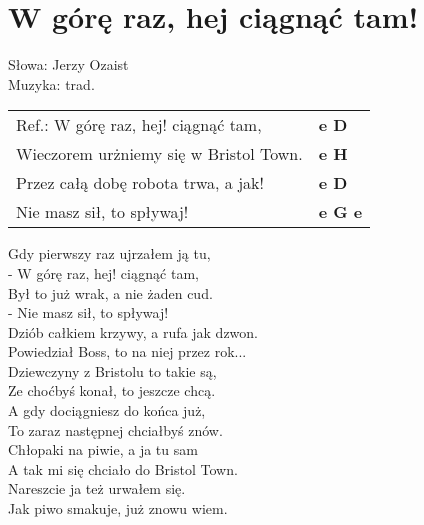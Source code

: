 \section{W górę raz, hej ciągnąć tam!}

Słowa: Jerzy Ozaist \\
Muzyka:  trad.

\vspace{2em}
\begin{tabular}{@{}p{9cm}@{}l@{}}
Ref.: W górę raz, hej! ciągnąć tam, & \bfseries  e D \\
Wieczorem urżniemy się w Bristol Town. & \bfseries  e H \\
Przez całą dobę robota trwa, a jak! & \bfseries  e D \\
Nie masz sił, to spływaj! & \bfseries e G e \\
\end{tabular}

\vspace{1em}
Gdy pierwszy raz ujrzałem ją tu, \\
- W górę raz, hej! ciągnąć tam, \\
Był to już wrak, a nie żaden cud. \\
- Nie masz sił, to spływaj! \\

Dziób całkiem krzywy, a rufa jak dzwon. \\
Powiedział Boss, to na niej przez rok... \\

Dziewczyny z Bristolu to takie są, \\
Ze choćbyś konał, to jeszcze chcą. \\

A gdy dociągniesz do końca już, \\
To zaraz następnej chciałbyś znów. \\

Chłopaki na piwie, a ja tu sam \\
A tak mi się chciało do Bristol Town. \\

Nareszcie ja też urwałem się. \\
Jak piwo smakuje, już znowu wiem. \\